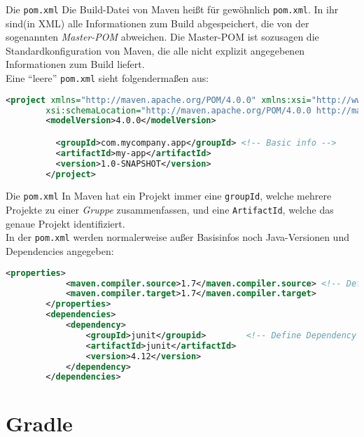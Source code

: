 \begin{frame}[fragile]{Die \texttt{pom.xml}}
    \onslide<+->
    Die Build-Datei von Maven heißt für gewöhnlich \texttt{pom.xml}. In ihr sind(in XML) alle Informationen zum Build abgespeichert,
    die von der sogenannten \textit{Master-POM} abweichen.
    Die Master-POM ist sozusagen die Standardkonfiguration von Maven, die alle nicht explizit angegebenen Informationen zum Build liefert.\\
    \onslide<+->
    Eine \enquote{leere} \texttt{pom.xml} sieht folgendermaßen aus:
    \begin{lstlisting}[basicstyle=\ttfamily\scriptsize,gobble=8,language=xml]
        <project xmlns="http://maven.apache.org/POM/4.0.0" xmlns:xsi="http://www.w3.org/2001/XMLSchema-instance"
        xsi:schemaLocation="http://maven.apache.org/POM/4.0.0 http://maven.apache.org/xsd/maven-4.0.0.xsd">
        <modelVersion>4.0.0</modelVersion>

          <groupId>com.mycompany.app</groupId> <!-- Basic info -->
          <artifactId>my-app</artifactId>
          <version>1.0-SNAPSHOT</version>
        </project>
    \end{lstlisting}
\end{frame}

\begin{frame}[fragile]{Die \texttt{pom.xml}}
    \onslide<+->
    In Maven hat ein Projekt immer eine \texttt{groupId}, welche mehrere Projekte zu einer \textit{Gruppe} zusammenfassen, und eine \texttt{ArtifactId}, welche das genaue Projekt identifiziert.\\
    \onslide<+->
    In der \texttt{pom.xml} werden normalerweise außer Basisinfos noch Java-Versionen und Dependencies angegeben:
    \begin{lstlisting}[basicstyle=\ttfamily\scriptsize,gobble=8,language=xml]
        <properties>
            <maven.compiler.source>1.7</maven.compiler.source> <!-- Define Java version -->
            <maven.compiler.target>1.7</maven.compiler.target>
        </properties>
        <dependencies>
            <dependency>
                <groupId>junit</groupid>        <!-- Define Dependency -->
                <artifactId>junit</artifactId>
                <version>4.12</version>
            </dependency>
        </dependencies>
    \end{lstlisting}
\end{frame}

\section{Gradle}

